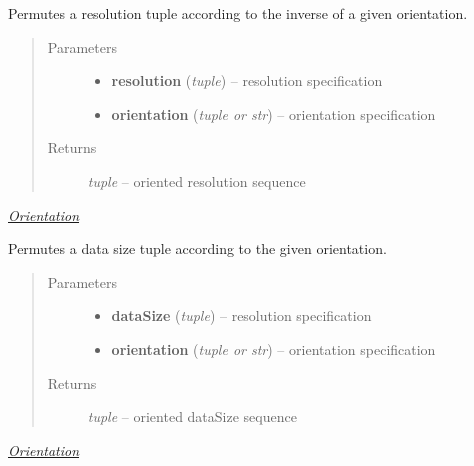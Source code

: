 \documentclass[letterpaper,10pt,english]{sphinxmanual}
\begin{document}

\begin{fulllineitems}
\label{api/ClearMap.Alignment:ClearMap.Alignment.Resampling.orientResolutionInverse}
Permutes a resolution tuple according to the inverse of a given orientation.
\begin{quote}\begin{description}
\item[{Parameters}] \leavevmode\begin{itemize}
\item {} 
\textbf{resolution} (\emph{tuple}) --
resolution specification

\item {} 
\textbf{orientation} (\emph{tuple or str}) --
orientation specification

\end{itemize}

\item[{Returns}] \leavevmode
\emph{tuple} --
oriented resolution sequence

\end{description}\end{quote}




{\hyperref[api/ClearMap.Alignment:orientation]{\emph{Orientation}}}



\end{fulllineitems}


\begin{fulllineitems}
\label{api/ClearMap.Alignment:ClearMap.Alignment.Resampling.orientDataSize}
Permutes a data size tuple according to the given orientation.
\begin{quote}\begin{description}
\item[{Parameters}] \leavevmode\begin{itemize}
\item {} 
\textbf{dataSize} (\emph{tuple}) --
resolution specification

\item {} 
\textbf{orientation} (\emph{tuple or str}) --
orientation specification

\end{itemize}

\item[{Returns}] \leavevmode
\emph{tuple} --
oriented dataSize sequence

\end{description}\end{quote}




{\hyperref[api/ClearMap.Alignment:orientation]{\emph{Orientation}}}



\end{fulllineitems}
\end{document}
